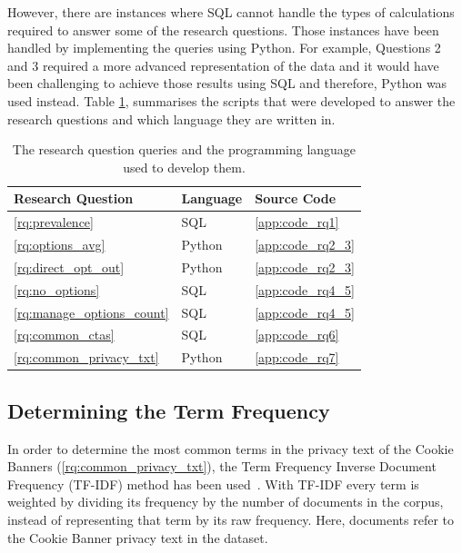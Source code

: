 \documentclass[../main.tex]{subfiles}
\begin{document}
However, there are instances where SQL cannot handle the types of calculations required to answer some of the research questions. Those instances have been handled by implementing the queries using Python. For example, Questions 2 and 3 required a more advanced representation of the data and it would have been challenging to achieve those results using SQL and therefore, Python was used instead. Table \ref{tab:impl_rqs_sc}, summarises the scripts that were developed to answer the research questions and which language they are written in. 

\begin{table}[ht]
    \centering
    \begin{tabular}{@{}lll@{}}
    \toprule
        \textbf{Research Question}      & \textbf{Language} & \textbf{Source Code}  \\ \midrule
        \ref{rq:prevalence}             & SQL               & \ref{app:code_rq1}    \\
        \ref{rq:options_avg}            & Python            & \ref{app:code_rq2_3}    \\
        \ref{rq:direct_opt_out}         & Python            & \ref{app:code_rq2_3}    \\
        \ref{rq:no_options}             & SQL               & \ref{app:code_rq4_5}    \\
        \ref{rq:manage_options_count}   & SQL               & \ref{app:code_rq4_5}    \\
        \ref{rq:common_ctas}            & SQL               & \ref{app:code_rq6}    \\
        \ref{rq:common_privacy_txt}     & Python            & \ref{app:code_rq7}    \\ \bottomrule
    \end{tabular}
    \caption{The research question queries and the programming language used to develop them.}
    \label{tab:impl_rqs_sc}
\end{table}

\subsection{Determining the Term Frequency}
In order to determine the most common terms in the privacy text of the Cookie Banners (\ref{rq:common_privacy_txt}), the Term Frequency Inverse Document Frequency (TF-IDF) method has been used~\cite{jones1972statistical, ramos2003using}. With TF-IDF every term is weighted by dividing its frequency by the number of documents in the corpus, instead of representing that term by its raw frequency. Here, documents refer to the Cookie Banner privacy text in the dataset.
\end{document}
